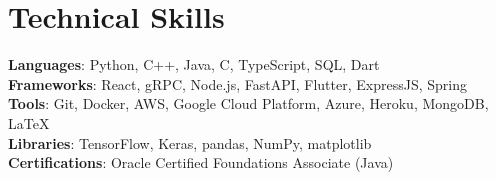 \documentclass[letterpaper,11pt]{article}
\begin{document}
\section{Technical Skills}
 \begin{itemize}[leftmargin=0.15in, label={}]
    \small{\item{
     \textbf{Languages}{: Python, C++, Java, C, TypeScript, SQL, Dart} \\
     \textbf{Frameworks}{: React, gRPC, Node.js, FastAPI, Flutter, ExpressJS, Spring} \\
     \textbf{Tools}{: Git, Docker, AWS, Google Cloud Platform, Azure, Heroku, MongoDB, \LaTeX} \\
     \textbf{Libraries}{: TensorFlow, Keras, pandas, NumPy, matplotlib} \\
     \textbf{Certifications}{: Oracle Certified Foundations Associate (Java)}
    }}
 \end{itemize}


\end{document}
